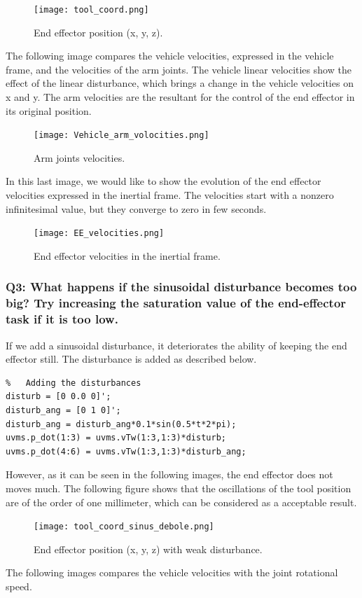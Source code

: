 \documentclass{article}
\begin{document}
\begin{figure}[H]
	\centering
	{\texttt{[image: tool\_coord.png]}}
	\caption{End effector position (x, y, z).}
	\label{im:tool_cord1}
\end{figure}
The following image compares the vehicle velocities, expressed in the vehicle frame, and the velocities of the arm joints. The vehicle linear velocities show the effect of the linear disturbance, which brings a change in the vehicle velocities on x and y. 
The arm velocities are the resultant for the control of the end effector in its original position. 

\begin{figure}[H]
	\centering
	{\texttt{[image: Vehicle\_arm\_volocities.png]}}
	\caption{Arm joints velocities.}
	\label{im:arm_vel1}
\end{figure}
In this last image, we would like to show the evolution of the end effector velocities expressed in the inertial frame. The velocities start with a nonzero infinitesimal value, but they converge to zero in few seconds.

\begin{figure}[H]
	\centering
	{\texttt{[image: EE\_velocities.png]}}
	\caption{End effector velocities in the inertial frame.}
	\label{im:tool_vel1}
\end{figure}


\subsubsection{Q3: What happens if the sinusoidal disturbance becomes too big? Try increasing the saturation value of the end-effector task if it is too low.}
If we add a sinusoidal disturbance, it deteriorates the ability of keeping the end effector still. The disturbance is added as described below. 
\begin{lstlisting}
%	Adding the disturbances
disturb = [0 0.0 0]';
disturb_ang = [0 1 0]';
disturb_ang = disturb_ang*0.1*sin(0.5*t*2*pi);
uvms.p_dot(1:3) = uvms.vTw(1:3,1:3)*disturb;
uvms.p_dot(4:6) = uvms.vTw(1:3,1:3)*disturb_ang;
\end{lstlisting}
However, as it can be seen in the following images, the end effector does not moves much. 
The following figure shows that the oscillations of the tool position are of the order of one millimeter, which can be considered as a acceptable result.  \\

\begin{figure}[H]
	\centering
	{\texttt{[image: tool\_coord\_sinus\_debole.png]}}
	\caption{End effector position (x, y, z) with weak disturbance.}
	\label{im:tool_cord2}
\end{figure}
The following images compares the vehicle velocities with the joint rotational speed.  \\ 
\end{document}
